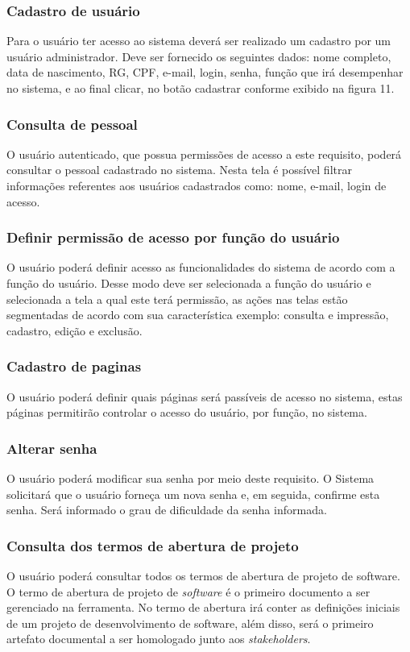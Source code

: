 \documentclass{acm_proc_article-sp}
\begin{document}
\subsubsection{Cadastro de usuário}
Para o usuário ter acesso ao sistema deverá ser realizado um cadastro por um usuário administrador. Deve ser fornecido os seguintes dados: nome completo, data de nascimento, RG, CPF, e-mail, login, senha, função que irá desempenhar no sistema, e ao final clicar, no botão cadastrar conforme exibido na figura 11.

\subsubsection{Consulta de pessoal}
O usuário autenticado, que possua permissões de acesso a este requisito, poderá consultar o pessoal cadastrado no sistema. Nesta tela é possível filtrar informações referentes aos usuários cadastrados como: nome, e-mail, login de acesso.   

\subsubsection{Definir permissão de acesso por função do usuário}
O usuário poderá definir acesso as funcionalidades do sistema de acordo com a função do usuário. Desse modo deve ser selecionada a função do usuário e selecionada a tela a qual este terá permissão, as ações nas telas estão segmentadas de acordo com sua característica exemplo: consulta e impressão, cadastro, edição e exclusão. 

\subsubsection{Cadastro de paginas}
O usuário poderá definir quais páginas será passíveis de acesso no sistema, estas páginas permitirão controlar o acesso do usuário, por função, no sistema.

\subsubsection{Alterar senha}
O usuário poderá modificar sua senha por meio deste requisito. O Sistema solicitará que o usuário forneça um nova senha e, em seguida, confirme esta senha. Será informado o grau de dificuldade da senha informada.

\subsubsection{Consulta dos termos de abertura de projeto}
O usuário poderá consultar todos os termos de abertura de projeto de software. O termo de abertura de projeto de \textit{software} é o primeiro documento a ser gerenciado na ferramenta. No termo de abertura irá conter as definições iniciais de um projeto de desenvolvimento de software, além disso, será o primeiro artefato documental a ser homologado junto aos \textit{stakeholders}.
\end{document}
